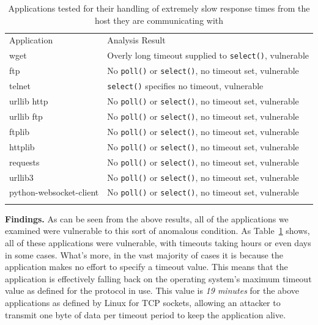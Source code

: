 \begin{table}[t]
  \scriptsize{}
  \begin{tabular}{l | l}
    \toprule{}
    Application              & Analysis Result\\
    wget                     & Overly long timeout supplied to {\tt select()}, vulnerable\\
    ftp                      & No {\tt poll()} or {\tt select()}, no timeout set, vulnerable\\
    telnet                   & {\tt select()} specifies no timeout, vulnerable\\
    urllib http              & No {\tt poll()} or {\tt select()}, no timeout set, vulnerable\\
    urllib ftp               & No {\tt poll()} or {\tt select()}, no timeout set, vulnerable\\
    ftplib                   & No {\tt poll()} or {\tt select()}, no timeout set, vulnerable\\
    httplib                  & No {\tt poll()} or {\tt select()}, no timeout set, vulnerable\\
    requests                 & No {\tt poll()} or {\tt select()}, no timeout set, vulnerable\\
    urllib3                  & No {\tt poll()} or {\tt select()}, no timeout set, vulnerable\\
    python-websocket-client  & No {\tt poll()} or {\tt select()}, no timeout set, vulnerable\\
    \bottomrule{}
  \end{tabular}
  \caption{Applications tested for their handling of extremely slow response
    times from the host they are communicating with}
  \label{table:slowloris}
\end{table}


{\bf Findings.}
As can be seen from the above results, all of the applications we examined were
vulnerable to this sort of anomalous condition.  
 As Table~\ref{table:slowloris} shows, all of these
applications  were vulnerable, with timeouts taking hours or
even days in some cases.
What's more, in the vast
majority of cases it is because the application makes no effort to specify a
timeout value.  This means that the application is effectively falling back on
the operating system's maximum timeout value as defined for the protocol in
use.  This value is \emph{19 minutes} for the above applications as defined by
Linux for TCP sockets, allowing an
attacker to transmit one byte of data per timeout period to keep the
application alive.

